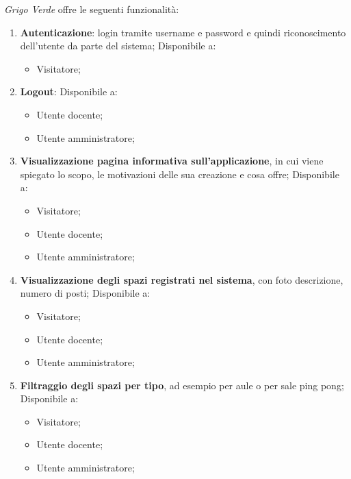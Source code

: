 \textit{Grigo Verde} offre le seguenti funzionalità:
\begin{enumerate}
    \item \textbf{Autenticazione}: login tramite username e password e quindi
    riconoscimento dell'utente da parte del sistema; Disponibile a: 
        \begin{itemize}
            \item Visitatore;
        \end{itemize}

    \item \textbf{Logout}: Disponibile a: 
        \begin{itemize}
            \item Utente docente;
            \item Utente amministratore;
        \end{itemize}

    \item \textbf{Visualizzazione pagina informativa sull'applicazione}, in cui
    viene spiegato lo scopo, le motivazioni delle sua creazione e cosa offre;
    Disponibile a:
        \begin{itemize}
            \item Visitatore;
            \item Utente docente;
            \item Utente amministratore;
        \end{itemize}

    \item \textbf{Visualizzazione degli spazi registrati nel sistema}, con foto
    descrizione, numero di posti; Disponibile a:
        \begin{itemize}
            \item Visitatore;
            \item Utente docente;
            \item Utente amministratore;
        \end{itemize}

    \item \textbf{Filtraggio degli spazi per tipo}, ad esempio per aule o per
    sale ping pong; Disponibile a:
        \begin{itemize}
            \item Visitatore;
            \item Utente docente;
            \item Utente amministratore;
        \end{itemize}


\end{enumerate}
